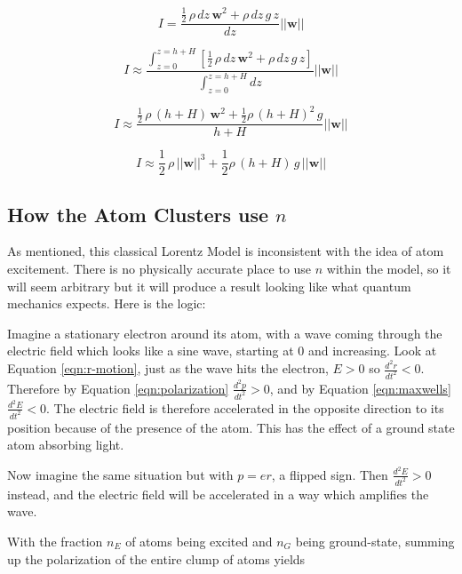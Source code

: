 \documentclass[12pt]{article}
\begin{document}
\begin{equation}
    I = \frac{\frac{1}{2}\,\rho\,dz\,\mathbf{w}^2 + \rho\,dz\,g\,z}{dz} ||\mathbf{w}||
\end{equation}

\begin{equation}
    I \approx \frac{\int_{z=0}^{z=h+H} \left[ \frac{1}{2}\,\rho\,dz\,\mathbf{w}^2 + \rho\,dz\,g\,z \right] }{\int_{z=0}^{z=h+H} dz} ||\mathbf{w}||
\end{equation}

\begin{equation}
    I \approx \frac{\frac{1}{2}\,\rho\,(h+H)\,\mathbf{w}^2 + \frac{1}{2}\rho\,(h+H)^2\,g }{h+H} ||\mathbf{w}||
\end{equation}

\begin{equation}
    I \approx \frac{1}{2}\,\rho\,||\mathbf{w}||^3 + \frac{1}{2}\rho\,(h+H)\,g\,||\mathbf{w}||
\end{equation}

\subsection{How the Atom Clusters use $n$}

As mentioned, this classical Lorentz Model is inconsistent with the idea of atom excitement. There is no physically accurate place to use $n$ within the model, so it will seem arbitrary but it will produce a result looking like what quantum mechanics expects. Here is the logic:

Imagine a stationary electron around its atom, with a wave coming through the electric field which looks like a sine wave, starting at 0 and increasing. Look at Equation \ref{eqn:r-motion}, just as the wave hits the electron, $E > 0$ so $\frac{d^2r}{dt^2} < 0$. Therefore by Equation \ref{eqn:polarization} $\frac{d^2p}{dt^2} > 0$, and by Equation \ref{eqn:maxwells} $\frac{d^2E}{dt^2} < 0$. The electric field is therefore accelerated in the opposite direction to its position because of the presence of the atom. This has the effect of a ground state atom absorbing light.

Now imagine the same situation but with $p = er$, a flipped sign. Then $\frac{d^2E}{dt^2} > 0$ instead, and the electric field will be accelerated in a way which amplifies the wave.

With the fraction $n_E$ of atoms being excited and $n_G$ being ground-state, summing up the polarization of the entire clump of atoms yields
\end{document}
